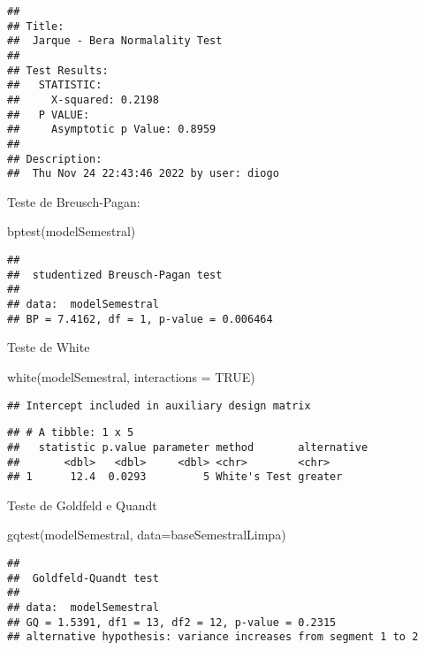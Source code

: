 \documentclass[
]{article}
\newenvironment{Shaded}{\begin{snugshade}}{\end{snugshade}}
\newcommand{\AttributeTok}[1]{\textcolor[rgb]{0.77,0.63,0.00}{#1}}
\newcommand{\ConstantTok}[1]{\textcolor[rgb]{0.00,0.00,0.00}{#1}}
\newcommand{\FunctionTok}[1]{\textcolor[rgb]{0.00,0.00,0.00}{#1}}
\newcommand{\NormalTok}[1]{#1}
\begin{document}
\begin{verbatim}
## 
## Title:
##  Jarque - Bera Normalality Test
## 
## Test Results:
##   STATISTIC:
##     X-squared: 0.2198
##   P VALUE:
##     Asymptotic p Value: 0.8959 
## 
## Description:
##  Thu Nov 24 22:43:46 2022 by user: diogo
\end{verbatim}

Teste de Breusch-Pagan:

\begin{Shaded}
\begin{Highlighting}[]
\FunctionTok{bptest}\NormalTok{(modelSemestral)}
\end{Highlighting}
\end{Shaded}

\begin{verbatim}
## 
##  studentized Breusch-Pagan test
## 
## data:  modelSemestral
## BP = 7.4162, df = 1, p-value = 0.006464
\end{verbatim}

Teste de White

\begin{Shaded}
\begin{Highlighting}[]
\FunctionTok{white}\NormalTok{(modelSemestral, }\AttributeTok{interactions =} \ConstantTok{TRUE}\NormalTok{)}
\end{Highlighting}
\end{Shaded}

\begin{verbatim}
## Intercept included in auxiliary design matrix
\end{verbatim}

\begin{verbatim}
## # A tibble: 1 x 5
##   statistic p.value parameter method       alternative
##       <dbl>   <dbl>     <dbl> <chr>        <chr>      
## 1      12.4  0.0293         5 White's Test greater
\end{verbatim}

Teste de Goldfeld e Quandt

\begin{Shaded}
\begin{Highlighting}[]
\FunctionTok{gqtest}\NormalTok{(modelSemestral, }\AttributeTok{data=}\NormalTok{baseSemestralLimpa)}
\end{Highlighting}
\end{Shaded}

\begin{verbatim}
## 
##  Goldfeld-Quandt test
## 
## data:  modelSemestral
## GQ = 1.5391, df1 = 13, df2 = 12, p-value = 0.2315
## alternative hypothesis: variance increases from segment 1 to 2
\end{verbatim}
\end{document}
